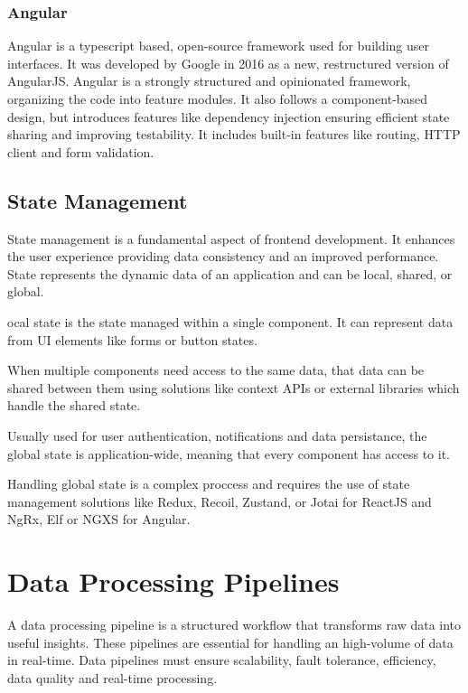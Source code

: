 \subsubsection{Angular}
Angular is a typescript based, open-source framework used for building user
interfaces. It was developed by Google in 2016 as a new, restructured version
of AngularJS. Angular is a strongly structured and opinionated framework,
organizing the code into feature modules. It also follows a component-based
design, but introduces features like dependency injection ensuring efficient
state sharing and improving testability.
It includes built-in features like routing, \gls{HTTP} client and form validation\cite{Alves}.

\subsection{State Management}
State management is a fundamental aspect of frontend development. It enhances
the user experience providing data consistency and an improved performance.
State represents the dynamic data of an application and can be local, shared,
or global\cite{tran2023state}.

ocal state is the state managed within a single component. It can
represent data from \gls{UI} elements like forms or button states.

When multiple components need access to the same data, that data can be shared
between them using solutions like context \gls{API}s or external libraries which
handle the shared state.

Usually used for user authentication, notifications and
data persistance, the global state is application-wide, meaning that
every component has access to it.

Handling global state is a complex proccess and requires the use of state
management solutions like Redux, Recoil, Zustand, or Jotai for ReactJS and
NgRx, Elf or NGXS for Angular\cite{tran2023state}.

\section{Data Processing Pipelines}
A data processing pipeline is a structured workflow that transforms raw data
into useful insights. These pipelines are essential for handling an high-volume
of data in real-time. Data pipelines must ensure scalability, fault tolerance,
efficiency, data quality and real-time processing.

